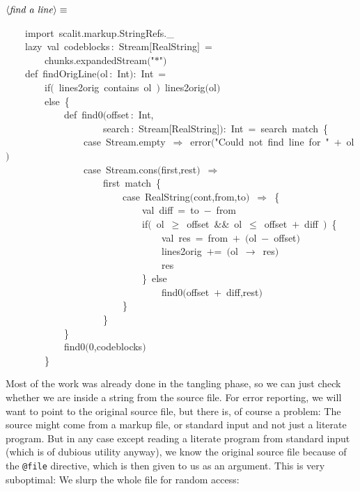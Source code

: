 \documentclass[a4paper,12pt]{article}
\begin{document}
$\left<\mbox{\emph{find a line}}\right>\equiv$
\begin{program}~~~~{\vem import}~scalit.markup.StringRefs.\_
\\~~~~{\vem lazy}~{\vem val}~codeblocks\,{\rm :}~Stream$[$RealString$]$~=
\\~~~~~~~~chunks.expandedStream$($"$*$"$)$
\\[0.5em]~~~~{\vem def}~findOrigLine$($ol\,{\rm :}~Int$)${\rm :}~Int~=
\\~~~~~~~~{\vem if}$($~lines2orig~contains~ol~$)$~lines2orig$($ol$)$
\\~~~~~~~~{\vem else}~{\small\{}
\\~~~~~~~~~~~~{\vem def}~find0$($offset\,{\rm :}~Int,
\\~~~~~~~~~~~~~~~~~~~~search\,{\rm :}~Stream$[$RealString$]$$)${\rm :}~Int~=~search~{\vem match}~{\small\{}
\\~~~~~~~~~~~~~~~~{\vem case}~Stream.empty~$\Rightarrow$~error$($"Could~not~find~line~{\vem for}~"~$+$~ol$)$
\\~~~~~~~~~~~~~~~~{\vem case}~Stream.cons$($first,rest$)$~$\Rightarrow$
\\~~~~~~~~~~~~~~~~~~~~first~{\vem match}~{\small\{}
\\~~~~~~~~~~~~~~~~~~~~~~~~{\vem case}~RealString$($cont,from,to$)$~$\Rightarrow$~{\small\{}
\\~~~~~~~~~~~~~~~~~~~~~~~~~~~~{\vem val}~diff~=~to~$-$~from
\\~~~~~~~~~~~~~~~~~~~~~~~~~~~~{\vem if}$($~ol~$\geq$~offset~\&\&~ol~$\leq$~offset~$+$~diff~$)$~{\small\{}
\\~~~~~~~~~~~~~~~~~~~~~~~~~~~~~~~~{\vem val}~res~=~from~$+$~$($ol~$-$~offset$)$
\\~~~~~~~~~~~~~~~~~~~~~~~~~~~~~~~~lines2orig~$+$=~$($ol~$\rightarrow$~res$)$
\\~~~~~~~~~~~~~~~~~~~~~~~~~~~~~~~~res
\\~~~~~~~~~~~~~~~~~~~~~~~~~~~~{\small\}}~{\vem else}
\\~~~~~~~~~~~~~~~~~~~~~~~~~~~~~~~~find0$($offset~$+$~diff,rest$)$
\\~~~~~~~~~~~~~~~~~~~~~~~~{\small\}}
\\~~~~~~~~~~~~~~~~~~~~{\small\}}
\\~~~~~~~~~~~~{\small\}}
\\[0.5em]~~~~~~~~~~~~find0$($0,codeblocks$)$
\\~~~~~~~~{\small\}}
\\[0.5em]\end{program}
Most of the work was already done in the tangling phase, so we can
just check whether we are inside a string from the source file. For error
reporting, we will want to point to the original source file, but there
is, of course a problem: The source might come from a markup file, or standard
input and not just a literate program. But in any case except reading a literate
program from standard input (which is of dubious utility anyway), we know the
original source file because of the \texttt{@file} directive, which is then given
to us as an argument. This is very suboptimal: We slurp the whole file
for random access:
\end{document}
